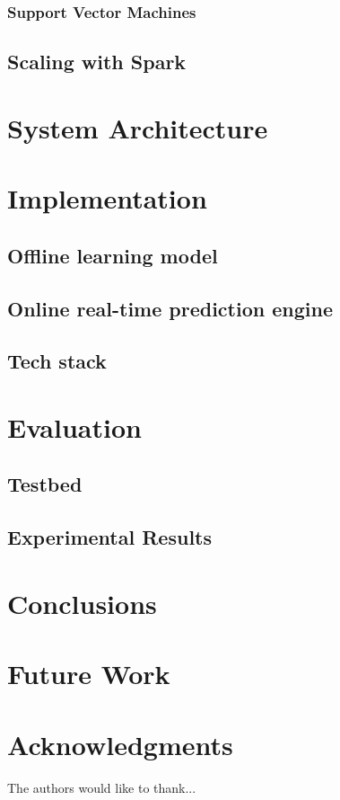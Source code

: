 \documentclass[conference]{IEEEtran}
\begin{document}
\subsubsection{Support Vector Machines}


\subsection{Scaling with Spark}


\section{System Architecture}


\section{Implementation}

\subsection{Offline learning model}

\subsection{Online real-time prediction engine}

\subsection{Tech stack}


\section{Evaluation}

\subsection{Testbed}

\subsection{Experimental Results}


\section{Conclusions}


\section{Future Work}


\section{Acknowledgments}
The authors would like to thank...




\end{document}
